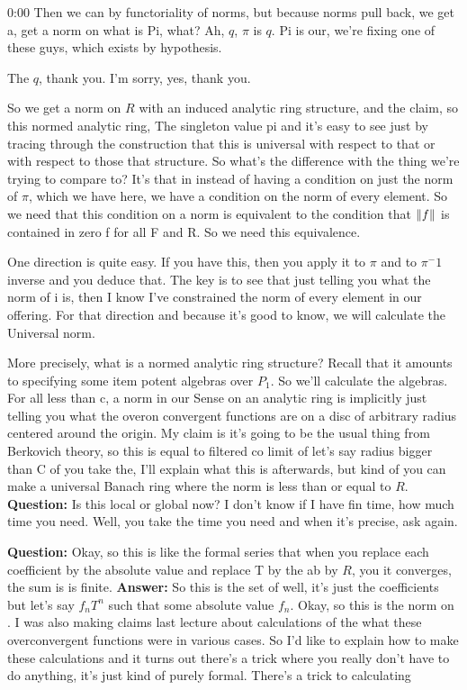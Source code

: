 \begin{unfinished}{0:00}
Then we can by functoriality of norms, but because norms pull back, we get a, get a norm on what is Pi, what? Ah, $q$, $\pi$ is $q$. Pi is our, we're fixing one of these guys, which exists by hypothesis.

The $q$, thank you. I'm sorry, yes, thank you.

So we get a norm on $R$ with an induced analytic ring structure, and the claim, so this normed analytic ring,
The singleton value pi and it's easy to see just by tracing through the construction that this is universal with respect to that or with respect to those that structure. So what's the difference with the thing we're trying to compare to? It's that in instead of having a condition on just the norm of $\pi$, which we have here, we have a condition on the norm of every element. So we need that this condition on a norm is equivalent to the condition that $\| f \|$ is contained in zero f for all F and R. So we need this equivalence.

One direction is quite easy. If you have this, then you apply it to $\pi$ and to $\pi^-1$ inverse and you deduce that. The key is to see that just telling you what the norm of i is, then I know I've constrained the norm of every element in our offering. For that direction and because it's good to know, we will calculate the Universal norm.

More precisely, what is a normed analytic ring structure? Recall that it amounts to specifying some item potent algebras over $P_1$. So we'll calculate the algebras. For all less than c, a norm in our Sense on an analytic ring is implicitly just telling you what the overon convergent functions are on a disc of arbitrary radius centered around the origin. My claim is it's going to be the usual thing from Berkovich theory, so this is equal to filtered co limit of let's say radius bigger than C of you take the, I'll explain what this is afterwards, but kind of you can make a universal Banach ring where the norm is less than or equal to $R$.
\textbf{Question:} Is this local or global now? I don't know if I have fin time, how much time you need. Well, you take the time you need and when it's precise, ask again.

\textbf{Question:} Okay, so this is like the formal series that when you replace each coefficient by the absolute value and replace T by the ab by $R$, you it converges, the sum is is finite. 
\textbf{Answer:} So this is the set of well, it's just the coefficients but let's say $f_n T^{n}$ such that some absolute value $f_n$. 
Okay, so this is the norm on . I was also making claims last lecture about calculations of the what these overconvergent functions were in various cases. So I'd like to explain how to make these calculations and it turns out there's a trick where you really don't have to do anything, it's just kind of purely formal.
There's a trick to calculating
 

\end{unfinished}
